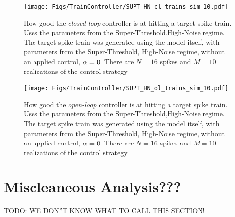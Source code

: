 \documentclass[12pt]{iopart}
\begin{document}
\begin{figure}[htp]
\begin{center}
  \texttt{[image: Figs/TrainController/SUPT\_HN\_cl\_trains\_sim\_10.pdf]}
  \caption[ ]{How good the {\sl closed-loop} controller is at hitting a target
  spike train. Uses the parameters from the Super-Threshold,High-Noise regime.
  The target spike train was generated using the model itself, with
  parameters from the Super-Threshold, High-Noise regime, without an applied
  control, ${\alpha}=0$.
  There are $N=16$ spikes and $M=10$ realizations of the control strategy}
  \label{fig:targettrain_cl_highnoise}
\end{center} 
\end{figure}
\begin{figure}[htp]
\begin{center}
  \texttt{[image: Figs/TrainController/SUPT\_HN\_ol\_trains\_sim\_10.pdf]}
  \caption[ ]{How good the {\sl open-loop} controller is at hitting a target
  spike train. Uses the parameters from the Super-Threshold,High-Noise regime.
  The target spike train was generated using the model itself, with
  parameters from the Super-Threshold, High-Noise regime, without an applied
  control, ${\alpha}=0$.
  There are $N=16$ spikes and $M=10$ realizations of the control strategy}
  \label{fig:targettrain_ol_highnoise}    
\end{center}
\end{figure}

\clearpage


\section{Miscleaneous Analysis???}
TODO: WE DON''T KNOW WHAT TO CALL THIS SECTION!
\end{document}

